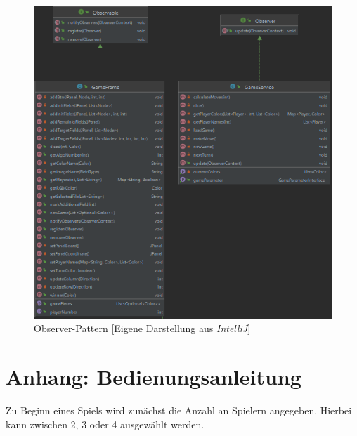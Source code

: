 \begin{figure}[htbp]
\centering
\centerline{\includegraphics[scale=.7]{observer}}
\caption{Observer-Pattern [Eigene Darstellung aus \emph{IntelliJ}]}
\label{fig:oberver}
\end{figure}

\newpage
\titlespacing*{\chapter}{0pt}{-30mm}{10pt}
  
\chapter{Anhang: Bedienungsanleitung}
\label{ch:anleitung}
\pagestyle{scrheadings}
\clearscrheadfoot
{}
\setcounter{page}{36}
\ofoot[\pagemark]{\pagemark}
\onehalfspacing

\noindent Zu Beginn eines Spiels wird zunächst die Anzahl an Spielern angegeben. Hierbei kann zwischen 2, 3 oder 4 ausgewählt werden.

